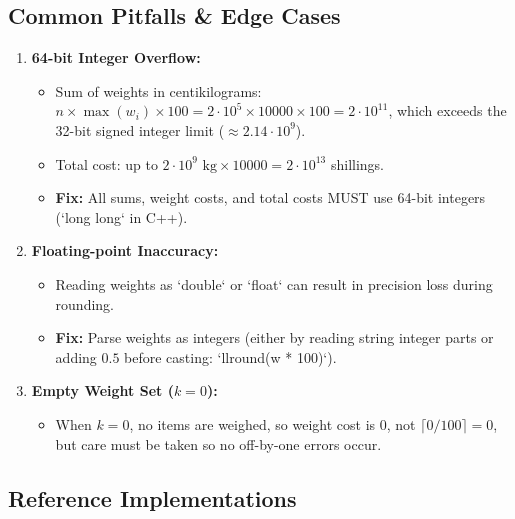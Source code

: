 \documentclass[a4paper,12pt]{article}
\begin{document}
\subsection*{Common Pitfalls \& Edge Cases}
\begin{enumerate}
    \item \textbf{64-bit Integer Overflow:}
    \begin{itemize}
        \item Sum of weights in centikilograms: $n \times \max(w_i) \times 100 = 2 \cdot 10^5 \times 10000 \times 100 = 2 \cdot 10^{11}$, which exceeds the 32-bit signed integer limit ($\approx 2.14 \cdot 10^9$).
        \item Total cost: up to $2 \cdot 10^9 \text{ kg} \times 10000 = 2 \cdot 10^{13}$ shillings.
        \item \textbf{Fix:} All sums, weight costs, and total costs MUST use 64-bit integers (`long long` in C++).
    \end{itemize}
    \item \textbf{Floating-point Inaccuracy:}
    \begin{itemize}
        \item Reading weights as `double` or `float` can result in precision loss during rounding.
        \item \textbf{Fix:} Parse weights as integers (either by reading string integer parts or adding $0.5$ before casting: `llround(w * 100)`).
    \end{itemize}
    \item \textbf{Empty Weight Set ($k=0$):}
    \begin{itemize}
        \item When $k=0$, no items are weighed, so weight cost is $0$, not $\lceil 0 / 100 \rceil = 0$, but care must be taken so no off-by-one errors occur.
    \end{itemize}
\end{enumerate}

\subsection*{Reference Implementations}
\end{document}
